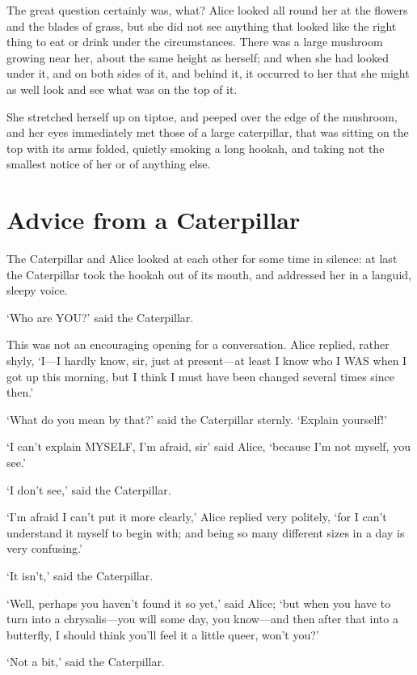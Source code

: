 \documentclass[12pt]{article}
\begin{document}
\begin{Parallel}[p]{}{}
{The great question certainly was, what? Alice looked all round her at the flowers and the blades of grass, but she did not see anything that looked like the right thing to eat or drink under the circumstances. There was a large mushroom growing near her, about the same height as herself; and when she had looked under it, and on both sides of it, and behind it, it occurred to her that she might as well look and see what was on the top of it.

She stretched herself up on tiptoe, and peeped over the edge of the mushroom, and her eyes immediately met those of a large caterpillar, that was sitting on the top with its arms folded, quietly smoking a long hookah, and taking not the smallest notice of her or of anything else.




\section{Advice from a Caterpillar}

The Caterpillar and Alice looked at each other for some time in silence: at last the Caterpillar took the hookah out of its mouth, and addressed her in a languid, sleepy voice.

‘Who are YOU?’ said the Caterpillar.

This was not an encouraging opening for a conversation. Alice replied, rather shyly, ‘I—I hardly know, sir, just at present—at least I know who I WAS when I got up this morning, but I think I must have been changed several times since then.’

‘What do you mean by that?’ said the Caterpillar sternly. ‘Explain yourself!’

‘I can’t explain MYSELF, I’m afraid, sir’ said Alice, ‘because I’m not myself, you see.’

‘I don’t see,’ said the Caterpillar.

‘I’m afraid I can’t put it more clearly,’ Alice replied very politely, ‘for I can’t understand it myself to begin with; and being so many different sizes in a day is very confusing.’

‘It isn’t,’ said the Caterpillar.

‘Well, perhaps you haven’t found it so yet,’ said Alice; ‘but when you have to turn into a chrysalis—you will some day, you know—and then after that into a butterfly, I should think you’ll feel it a little queer, won’t you?’

‘Not a bit,’ said the Caterpillar.

}
\end{Parallel}
\end{document}
